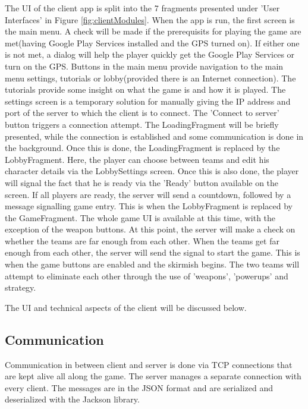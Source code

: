 \documentclass{article}
\begin{document}
The UI of the client app is split into the 7 fragments presented under 'User
Interfaces' in Figure \ref{fig:clientModules}. When the app is run, the first
screen is the main menu. A check will be made if the prerequisits for
playing the game are met(having Google Play Services installed and the
GPS turned on). If either one is not met, a dialog will help the player
quickly get the Google Play Services or turn on the GPS. Buttons in the main
menu provide navigation to the main menu settings, tutorials or lobby(provided
there is an Internet connection). The tutorials provide some insight on what the
game is and how it is played. The settings screen is a temporary solution for
manually giving the IP address and port of the server to which the client is to
connect. The 'Connect to server' button triggers a connection attempt. The
LoadingFragment will be briefly presented, while the connection is established
and some communication is done in the background. Once this is done, the
LoadingFragment is replaced by the LobbyFragment. Here, the player can choose
between teams and edit his character details via the LobbySettings screen. Once
this is also done, the player will signal the fact that he is ready via the
'Ready' button available on the screen. If all players are ready, the server
will send a countdown, followed by a message signalling game entry. This is when
the LobbyFragment is replaced by the GameFragment. The whole game UI is
available at this time, with the exception of the weapon buttons. At this point,
the server will make a check on whether the teams are far enough from each
other. When the teams get far enough from each other, the server will send the
signal to start the game. This is when the game buttons are enabled and the
skirmish begins. The two teams will attempt to eliminate each other through the
use of 'weapons', 'powerups' and strategy.\newline

The UI and technical aspects of the client will be discussed below.\newline


\subsection{Communication}

Communication in between client and server is done via TCP connections that are
kept alive all along the game. The server manages a separate connection with
every client. The messages are in the JSON format and are serialized and
deserialized with the Jackson library.\newline
\end{document}
